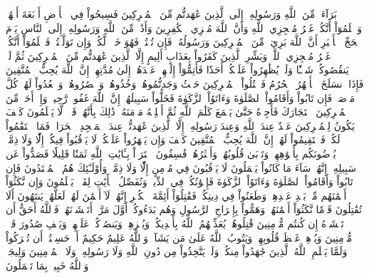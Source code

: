 بَرَآءَةٞ مِّنَ ٱللَّهِ وَرَسُولِهِۦٓ إِلَى ٱلَّذِينَ عَٰهَدتُّم مِّنَ ٱلۡمُشۡرِكِينَ
فَسِيحُواْ فِي ٱلۡأَرۡضِ أَرۡبَعَةَ أَشۡهُرٖ وَٱعۡلَمُوٓاْ أَنَّكُمۡ غَيۡرُ مُعۡجِزِي ٱللَّهِ وَأَنَّ ٱللَّهَ مُخۡزِي ٱلۡكَٰفِرِينَ
وَأَذَٰنٞ مِّنَ ٱللَّهِ وَرَسُولِهِۦٓ إِلَى ٱلنَّاسِ يَوۡمَ ٱلۡحَجِّ ٱلۡأَكۡبَرِ أَنَّ ٱللَّهَ بَرِيٓءٞ مِّنَ ٱلۡمُشۡرِكِينَ وَرَسُولُهُۥۚ فَإِن تُبۡتُمۡ فَهُوَ خَيۡرٞ لَّكُمۡۖ وَإِن تَوَلَّيۡتُمۡ فَٱعۡلَمُوٓاْ أَنَّكُمۡ غَيۡرُ مُعۡجِزِي ٱللَّهِۗ وَبَشِّرِ ٱلَّذِينَ كَفَرُواْ بِعَذَابٍ أَلِيمٍ
إِلَّا ٱلَّذِينَ عَٰهَدتُّم مِّنَ ٱلۡمُشۡرِكِينَ ثُمَّ لَمۡ يَنقُصُوكُمۡ شَيۡـٔٗا وَلَمۡ يُظَٰهِرُواْ عَلَيۡكُمۡ أَحَدٗا فَأَتِمُّوٓاْ إِلَيۡهِمۡ عَهۡدَهُمۡ إِلَىٰ مُدَّتِهِمۡۚ إِنَّ ٱللَّهَ يُحِبُّ ٱلۡمُتَّقِينَ
فَإِذَا ٱنسَلَخَ ٱلۡأَشۡهُرُ ٱلۡحُرُمُ فَٱقۡتُلُواْ ٱلۡمُشۡرِكِينَ حَيۡثُ وَجَدتُّمُوهُمۡ وَخُذُوهُمۡ وَٱحۡصُرُوهُمۡ وَٱقۡعُدُواْ لَهُمۡ كُلَّ مَرۡصَدٖۚ فَإِن تَابُواْ وَأَقَامُواْ ٱلصَّلَوٰةَ وَءَاتَوُاْ ٱلزَّكَوٰةَ فَخَلُّواْ سَبِيلَهُمۡۚ إِنَّ ٱللَّهَ غَفُورٞ رَّحِيمٞ
وَإِنۡ أَحَدٞ مِّنَ ٱلۡمُشۡرِكِينَ ٱسۡتَجَارَكَ فَأَجِرۡهُ حَتَّىٰ يَسۡمَعَ كَلَٰمَ ٱللَّهِ ثُمَّ أَبۡلِغۡهُ مَأۡمَنَهُۥۚ ذَٰلِكَ بِأَنَّهُمۡ قَوۡمٞ لَّا يَعۡلَمُونَ
كَيۡفَ يَكُونُ لِلۡمُشۡرِكِينَ عَهۡدٌ عِندَ ٱللَّهِ وَعِندَ رَسُولِهِۦٓ إِلَّا ٱلَّذِينَ عَٰهَدتُّمۡ عِندَ ٱلۡمَسۡجِدِ ٱلۡحَرَامِۖ فَمَا ٱسۡتَقَٰمُواْ لَكُمۡ فَٱسۡتَقِيمُواْ لَهُمۡۚ إِنَّ ٱللَّهَ يُحِبُّ ٱلۡمُتَّقِينَ
كَيۡفَ وَإِن يَظۡهَرُواْ عَلَيۡكُمۡ لَا يَرۡقُبُواْ فِيكُمۡ إِلّٗا وَلَا ذِمَّةٗۚ يُرۡضُونَكُم بِأَفۡوَٰهِهِمۡ وَتَأۡبَىٰ قُلُوبُهُمۡ وَأَكۡثَرُهُمۡ فَٰسِقُونَ
ٱشۡتَرَوۡاْ بِـَٔايَٰتِ ٱللَّهِ ثَمَنٗا قَلِيلٗا فَصَدُّواْ عَن سَبِيلِهِۦٓۚ إِنَّهُمۡ سَآءَ مَا كَانُواْ يَعۡمَلُونَ
لَا يَرۡقُبُونَ فِي مُؤۡمِنٍ إِلّٗا وَلَا ذِمَّةٗۚ وَأُوْلَـٰٓئِكَ هُمُ ٱلۡمُعۡتَدُونَ
فَإِن تَابُواْ وَأَقَامُواْ ٱلصَّلَوٰةَ وَءَاتَوُاْ ٱلزَّكَوٰةَ فَإِخۡوَٰنُكُمۡ فِي ٱلدِّينِۗ وَنُفَصِّلُ ٱلۡأٓيَٰتِ لِقَوۡمٖ يَعۡلَمُونَ
وَإِن نَّكَثُوٓاْ أَيۡمَٰنَهُم مِّنۢ بَعۡدِ عَهۡدِهِمۡ وَطَعَنُواْ فِي دِينِكُمۡ فَقَٰتِلُوٓاْ أَئِمَّةَ ٱلۡكُفۡرِ إِنَّهُمۡ لَآ أَيۡمَٰنَ لَهُمۡ لَعَلَّهُمۡ يَنتَهُونَ
أَلَا تُقَٰتِلُونَ قَوۡمٗا نَّكَثُوٓاْ أَيۡمَٰنَهُمۡ وَهَمُّواْ بِإِخۡرَاجِ ٱلرَّسُولِ وَهُم بَدَءُوكُمۡ أَوَّلَ مَرَّةٍۚ أَتَخۡشَوۡنَهُمۡۚ فَٱللَّهُ أَحَقُّ أَن تَخۡشَوۡهُ إِن كُنتُم مُّؤۡمِنِينَ
قَٰتِلُوهُمۡ يُعَذِّبۡهُمُ ٱللَّهُ بِأَيۡدِيكُمۡ وَيُخۡزِهِمۡ وَيَنصُرۡكُمۡ عَلَيۡهِمۡ وَيَشۡفِ صُدُورَ قَوۡمٖ مُّؤۡمِنِينَ
وَيُذۡهِبۡ غَيۡظَ قُلُوبِهِمۡۗ وَيَتُوبُ ٱللَّهُ عَلَىٰ مَن يَشَآءُۗ وَٱللَّهُ عَلِيمٌ حَكِيمٌ
أَمۡ حَسِبۡتُمۡ أَن تُتۡرَكُواْ وَلَمَّا يَعۡلَمِ ٱللَّهُ ٱلَّذِينَ جَٰهَدُواْ مِنكُمۡ وَلَمۡ يَتَّخِذُواْ مِن دُونِ ٱللَّهِ وَلَا رَسُولِهِۦ وَلَا ٱلۡمُؤۡمِنِينَ وَلِيجَةٗۚ وَٱللَّهُ خَبِيرُۢ بِمَا تَعۡمَلُونَ
